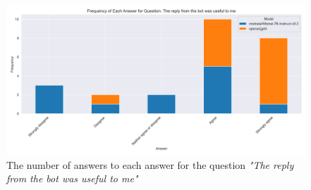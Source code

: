\begin{figure}[H]
    \centering
    \includegraphics[width=\textwidth]{results/plots/assets/feedback-02-frequency-of-answer-for-question-per-model-d474ac.png}
    \caption{The number of answers to each answer for the question \textit{"The reply from the bot was useful to me"}}
    \label{fig:feedback_02_frequency_of_answer_for_question_per_model_d474ac}
\end{figure}